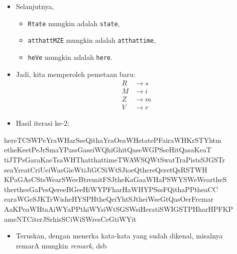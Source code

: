 \documentclass{article}
\begin{document}
\begin{itemize}
    \item Selanjutnya,
    \begin{itemize}
        \item \texttt{Rtate} mungkin adalah \texttt{state},
        \item \texttt{atthattMZE} mungkin adalah \texttt{atthattime},
        \item \texttt{heVe} mungkin adalah \texttt{here}.
    \end{itemize}
    \item Jadi, kita memperoleh pemetaan baru:
    \[
    \begin{aligned}
    R & \rightarrow s \\
    M & \rightarrow i \\
    Z & \rightarrow m \\
    V & \rightarrow r
    \end{aligned}
    \]
\end{itemize}

\newpage


\begin{itemize}
  \item Hasil iterasi ke-2:
\end{itemize}

\vspace{5mm}

\begin{flushleft}
hereTCSWPeYraWHarSseQithaYraOeaWHstatePFairaWHKrSTYhtm\\
etheKeetPeJrSmaYPassGaseiWQhiGhitQaseWGPSseHitQasaKeaT\\
tiJTPsGaraKaeTsaWHThatthattimeTWAWSQWtSwatTraPistsSJGSTr\\
seaYreatCriUeiWasGieWtiJiGCSiWtSJioeQthereQeretQsRSTWH\\
KPaGAsCStsWearSWeeBtremitFSJtheKaGaaWHaPSWYSWeWeartheS\\
therthesGaPesQereeBGeeHiWYPFharHaWHYPSssFQithaPPtheaCC\\
earaWGeSJKTrWisheHYSPHtheQeiYhtSJtheiWseGtQasOerFremar\\
AaKPeaWHtaAiWYaPPthiWYsiWtSGSWsiHeratiSWIGSTPHharHPFKP\\
ameNTCiterJSrhisSCiWiSWresCeGtiWYit
\end{flushleft}

\vspace{10mm}

\begin{itemize}
  \item Teruskan, dengan menerka kata-kata yang sudah dikenal, misalnya\\
  \quad remarA mungkin \textit{remark}, dsb
\end{itemize}
\end{document}
